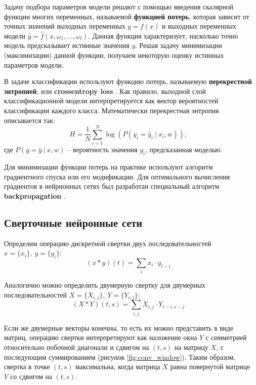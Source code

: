 Задачу подбора параметров модели решают с помощью введения скалярной функции многих переменных, называемой \textbf{функцией потерь}, которая зависит от точных значений выходных переменных $y = f(x)$ и выходных переменных модели $\hat{y} = \hat{f}(x, \omega_1, \ldots, \omega_l)$.
Данная функция характеризует, насколько точно модель предсказывает истинные значения $y$.
Решая задачу минимизации (максимизации) данной функции, получаем некоторую оценку истинных параметров модели.

В задаче классификации используют функцию потерь, называемую \textbf{перекрестной энтропией}, или \textbf{crossentropy loss} \cite{VorontsovML}.
Как правило, выходной слой классификационной модели интерпретируется как вектор вероятностей классификации каждого класса.
Математически перекрестная энтропия описывается так:
\begin{equation}
    H = \frac{1}{N} \sum_{i = 1}^{N} \log(P(y_i = \hat{y}_i\ |\ x_i, w)),
\end{equation}
где $P(y = \hat{y}\ |\ x, w)$ -- вероятность значения $y_i$, предсказанная моделью.

Для минимизации функции потерь на практике используют алгоритм градиентного спуска или его модификации.
Для оптимального вычисления градиентов в нейрнонных сетях был разработан специальный алгоритм \textbf{backpropagation} \cite{backprop}.

\subsection{Сверточные нейронные сети}

Определим операцию дискретной свертки двух последовательностей $x = \{x_i\},\ y = \{y_i\}$:
\begin{equation}
    (x * y)(t) = \sum_{i} x_i \cdot y_{t - i}
\end{equation}

Аналогично можно определить двумерную свертку для двумерных последовательностей $X = \{X_{i,j}\},\ Y = \{Y_{i,j}\}$:
\begin{equation}
    (X * Y)(t, s) = \sum_{i, j} X_{i,j} \cdot Y_{t - i, s - j}
\end{equation}

Если же двумерные векторы конечны, то есть их можно представить в виде матриц, операцию свертки интерпретируют как наложение окна $Y$ с симметрией относительно побочной диагонали и сдвигом на $(t, s)$ на матрицу $X$, с последующим суммированием (рисунок \ref{fig:conv_window}).
Таким образом, свертка в точке $(t, s)$ максимальна, когда матрица $X$ равна повернутой матрице $Y$ со сдвигом на $(t, s)$.

